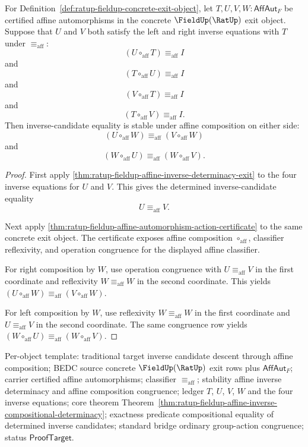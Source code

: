\begin{theorem}
\label{thm:ratup-fieldup-affine-inverse-compositional-determinacy}
For Definition~\ref{def:ratup-fieldup-concrete-exit-object}, let
$T,U,V,W:\mathsf{AffAut}_F$ be certified affine automorphisms in the concrete
$\FieldUp(\RatUp)$ exit object. Suppose that $U$ and $V$ both satisfy the left
and right inverse equations with $T$ under $\equiv_{\mathrm{aff}}$:
$$
(U\circ_{\mathrm{aff}}T)\equiv_{\mathrm{aff}} I
$$
and
$$
(T\circ_{\mathrm{aff}}U)\equiv_{\mathrm{aff}} I
$$
and
$$
(V\circ_{\mathrm{aff}}T)\equiv_{\mathrm{aff}} I
$$
and
$$
(T\circ_{\mathrm{aff}}V)\equiv_{\mathrm{aff}} I.
$$
Then inverse-candidate equality is stable under affine composition on either
side:
$$
(U\circ_{\mathrm{aff}}W)\equiv_{\mathrm{aff}}(V\circ_{\mathrm{aff}}W)
$$
and
$$
(W\circ_{\mathrm{aff}}U)\equiv_{\mathrm{aff}}(W\circ_{\mathrm{aff}}V).
$$
\end{theorem}
\begin{proof}
First apply
\autoref{thm:ratup-fieldup-affine-inverse-determinacy-exit} to the four inverse
equations for $U$ and $V$. This gives the determined inverse-candidate equality
$$
U\equiv_{\mathrm{aff}}V.
$$

Next apply
\autoref{thm:ratup-fieldup-affine-automorphism-action-certificate} to the same
concrete exit object. The certificate exposes affine composition
$\circ_{\mathrm{aff}}$, classifier reflexivity, and operation congruence for the
displayed affine classifier.

For right composition by $W$, use operation congruence with
$U\equiv_{\mathrm{aff}}V$ in the first coordinate and reflexivity
$W\equiv_{\mathrm{aff}}W$ in the second coordinate. This yields
$(U\circ_{\mathrm{aff}}W)\equiv_{\mathrm{aff}}(V\circ_{\mathrm{aff}}W)$.

For left composition by $W$, use reflexivity $W\equiv_{\mathrm{aff}}W$ in the
first coordinate and $U\equiv_{\mathrm{aff}}V$ in the second coordinate. The
same congruence row yields
$(W\circ_{\mathrm{aff}}U)\equiv_{\mathrm{aff}}(W\circ_{\mathrm{aff}}V)$.
\end{proof}

Per-object template: traditional target inverse candidate descent through
affine composition; BEDC source concrete $\FieldUp(\RatUp)$ exit rows plus
$\mathsf{AffAut}_F$; carrier certified affine automorphisms; classifier
$\equiv_{\mathrm{aff}}$; stability affine inverse determinacy and affine
composition congruence; ledger $T$, $U$, $V$, $W$ and the four inverse
equations; core theorem
Theorem~\ref{thm:ratup-fieldup-affine-inverse-compositional-determinacy};
exactness predicate compositional equality of determined inverse candidates;
standard bridge ordinary group-action congruence; status $\mathsf{ProofTarget}$.
